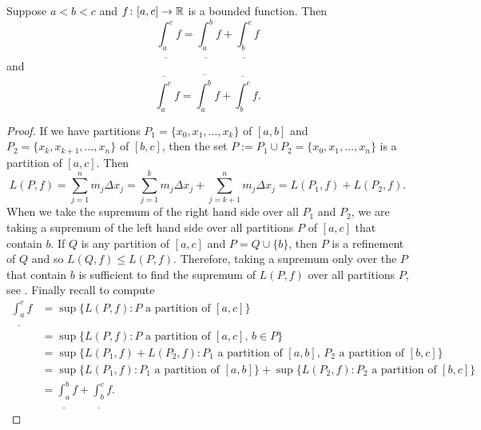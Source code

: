 \begin{lemma} \label{lemma:darbouxadd}
Suppose $a < b < c$ and $f \colon [a,c] \to {\mathbb{R}}$ is a bounded function.
Then
\begin{equation*}
\underline{\int_a^c} f
=
\underline{\int_a^b} f
+
\underline{\int_b^c} f
\end{equation*}
and
\begin{equation*}
\overline{\int_a^c} f
=
\overline{\int_a^b} f
+
\overline{\int_b^c} f .
\end{equation*}
\end{lemma}

\begin{proof}
If we have partitions $P_1 = \{ x_0,x_1,\ldots,x_k \}$
of $[a,b]$ and $P_2 = \{ x_k, x_{k+1}, \ldots, x_n \}$ of $[b,c]$,
then the set $P := P_1 \cup P_2 = \{ x_0, x_1, \ldots, x_n \}$ is
a partition of $[a,c]$.  Then
\begin{equation*}
L(P,f) =
\sum_{j=1}^n m_j \Delta x_j
=
\sum_{j=1}^k m_j \Delta x_j
+
\sum_{j=k+1}^n m_j \Delta x_j
=
L(P_1,f) + L(P_2,f) .
\end{equation*}
When we take the supremum of the right hand side over all $P_1$ and $P_2$,
we are taking a supremum of the left hand side
over all partitions $P$ of $[a,c]$ that contain $b$.  If $Q$ is any partition
of $[a,c]$ and $P = Q \cup \{ b \}$, then $P$ is a refinement of $Q$
and so $L(Q,f) \leq L(P,f)$.  Therefore, taking a supremum only over the $P$
that contain $b$ is sufficient to find the supremum of $L(P,f)$
over all partitions $P$, see .
Finally recall 
to compute
\begin{equation*}
\begin{split}
\underline{\int_a^c} f
& =
\sup \{ L(P,f) : \text{$P$ a partition of $[a,c]$} \}
\\
& =
\sup \{ L(P,f) : \text{$P$ a partition of $[a,c]$, $b \in P$} \}
\\
& =
\sup \{ L(P_1,f) + L(P_2,f) :
\text{$P_1$ a partition of $[a,b]$, $P_2$ a partition of $[b,c]$} \}
\\
& =
\sup \{ L(P_1,f) : \text{$P_1$ a partition of $[a,b]$} \}
+
\sup \{ L(P_2,f) : \text{$P_2$ a partition of $[b,c]$} \}
\\
&=
\underline{\int_a^b} f + \underline{\int_b^c} f .
\end{split}
\end{equation*}


\end{proof}
